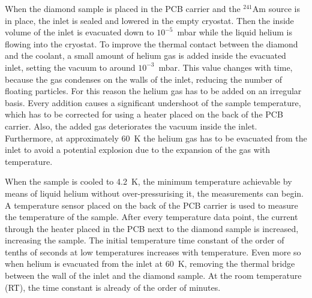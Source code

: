 When the diamond sample is placed in the PCB carrier and the $^{241}$Am source is in place, the inlet is sealed and lowered in the empty cryostat. Then the inside volume of the inlet is evacuated down to $10^{-5}$~mbar while the liquid helium is flowing into the cryostat. To improve the thermal contact between the diamond and the coolant, a small amount of helium gas is added inside the evacuated inlet, setting the vacuum to around $10^{-3}$~mbar. This value changes with time, because the gas condenses on the walls of the inlet, reducing the number of floating particles. For this reason the helium gas has to be added on an irregular basis. Every addition causes a significant undershoot of the sample temperature, which has to be corrected for using a heater placed on the back of the PCB carrier. Also, the added gas deteriorates the vacuum inside the inlet. 
Furthermore, at approximately 60~K the helium gas has to be evacuated from the inlet to avoid a potential explosion due to the expansion of the gas with temperature. 

When the sample is cooled to 4.2~K, the minimum temperature achievable by means of liquid helium without over-pressurising it, the measurements can begin. A temperature sensor placed on the back of the PCB carrier is used to measure the temperature of the sample. After every temperature data point, the current through the heater placed in the PCB next to the diamond sample is increased, increasing the sample. The initial temperature time constant of the order of tenths of seconds at low temperatures increases with temperature. Even more so when helium is evacuated from the inlet at 60~K, removing the thermal bridge between the wall of the inlet and the diamond sample. At the room temperature (RT), the time constant is already of the order of minutes.










